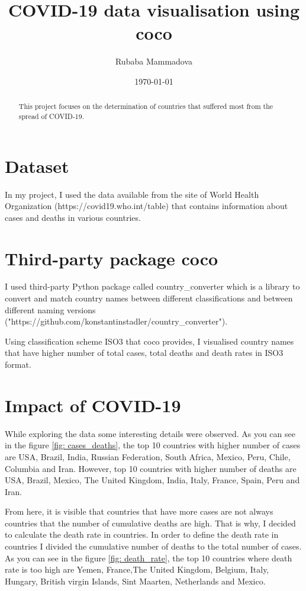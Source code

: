 \documentclass[12pt, letterpaper]{article}
\title{COVID-19 data visualisation using coco}
\author{Rubaba Mammadova}
\date{\today}
\begin{document}
\maketitle

\begin{abstract}
This project focuses on the determination of countries that suffered most from the spread of COVID-19. 
\end{abstract}

\section{Dataset}

In my project, I used the data available from the site of World Health Organization (https://covid19.who.int/table) that contains information about cases and deaths in various countries.

\section{Third-party package coco}

I used third-party Python package called country\_converter which is a library to convert and match country names between different classifications and between different naming versions ("https://github.com/konstantinstadler/country\_converter").

Using classification scheme ISO3 that coco provides, I visualised country names that have higher number of total cases, total deaths and death rates in ISO3 format.
\section{Impact of COVID-19 }

While exploring the data some interesting details were observed. As you can see in the figure \ref{fig: cases_deaths}, the top 10 countries with higher number of cases are USA, Brazil, India, Russian Federation, South Africa, Mexico, Peru, Chile, Columbia and Iran. However, top 10 countries with higher number of deaths are USA, Brazil, Mexico, The United Kingdom, India, Italy, France, Spain, Peru and Iran.

From here, it is visible that countries that have more cases are not always countries that the number of cumulative deaths are high. That is why, I decided to calculate the death rate in countries. In order to define the death rate in countries I divided the cumulative number of deaths to the total number of cases. As you can see in the figure \ref{fig: death_rate}, the top 10 countries where death rate is too high are Yemen, France,The United Kingdom, Belgium, Italy, Hungary, British virgin Islands, Sint Maarten, Netherlands and Mexico. 
\end{document}
